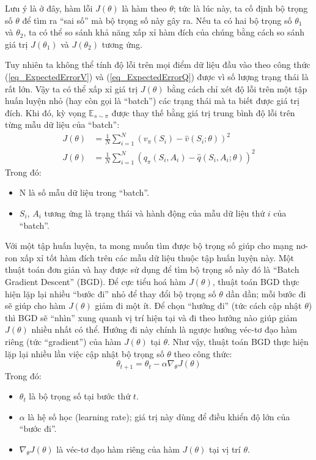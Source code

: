 	Lưu ý là ở đây, hàm lỗi $J(\theta)$ là hàm theo $\theta$; tức là lúc này, ta cố định bộ trọng số $\theta$ để tìm ra ``sai số'' mà bộ trọng số này gây ra.
	Nếu ta có hai bộ trọng số $\theta_1$ và $\theta_2$, ta có thể so sánh khả năng xấp xỉ hàm đích của chúng bằng cách so sánh giá trị $J(\theta_1)$ và $J(\theta_2)$ tương ứng.
	
	Tuy nhiên ta không thể tính độ lỗi trên mọi điểm dữ liệu đầu vào theo công thức (\ref{eq_ExpectedErrorV}) và (\ref{eq_ExpectedErrorQ}) được vì số lượng trạng thái là rất lớn.
	Vậy ta có thể xấp xỉ giá trị $J(\theta)$ bằng cách chỉ xét độ lỗi trên một tập huấn luyện nhỏ (hay còn gọi là ``batch'') các trạng thái mà ta biết được giá trị đích.
	Khi đó, kỳ vọng $\mathbb{E}_{s \sim \pi}$ được thay thế bằng giá trị trung bình độ lỗi trên từng mẫu dữ liệu của ``batch'':
	\begin{align}
		\label{eq_BatchErrorV}
		J(\theta) &= \frac{1}{N} \sum_{i = 1}^{N}(v_{\pi}(S_{i}) - \hat{v}(S_{i};\theta))^2\\
		\label{eq_BatchErrorQ}
		J(\theta) &= \frac{1}{N} \sum_{i = 1}^{N}(q_{\pi}(S_i,A_i) - \hat{q}(S_i,A_i;\theta))^2		
	\end{align}
	Trong đó:
	\begin{itemize}
		\item N là số mẫu dữ liệu trong ``batch''.
		\item $S_i$, $A_i$ tương ứng là trạng thái và hành động của mẫu dữ liệu thứ $i$ của ``batch''.
	\end{itemize}
	Với một tập huấn luyện, ta mong muốn tìm được bộ trọng số giúp cho mạng nơ-ron xấp xỉ tốt hàm đích trên các mẫu dữ liệu thuộc tập huấn luyện này.
	Một thuật toán đơn giản và hay được sử dụng để tìm bộ trọng số này đó là ``Batch Gradient Descent'' (BGD).
	Để cực tiểu hoá hàm $J(\theta)$, thuật toán BGD thực hiện lặp lại nhiều ``bước đi'' nhỏ để thay đổi bộ trọng số $\theta$ dần dần; mỗi bước đi sẽ giúp cho hàm $J(\theta)$ giảm đi một ít.
	Để chọn ``hướng đi'' (tức cách cập nhật $\theta$) thì BGD sẽ ``nhìn'' xung quanh vị trí hiện tại và đi theo hướng nào giúp giảm $J(\theta)$ nhiều nhất có thể.
	Hướng đi này chính là ngược hướng véc-tơ đạo hàm riêng (tức ``gradient'') của hàm $J(\theta)$ tại $\theta$.
	Như vậy, thuật toán BGD thực hiện lặp lại nhiều lần việc cập nhật bộ trọng số $\theta$ theo công thức:
	\begin{equation}
		\theta_{t+1} = \theta_{t} - \alpha \nabla_{\theta}J(\theta)
	\end{equation}
	Trong đó:
	\begin{itemize}
		\item $\theta_{t}$ là bộ trọng số tại bước thứ $t$.
		\item $\alpha$ là hệ số học (learning rate); giá trị này dùng để điều khiển độ lớn của ``bước đi''.
		\item $\nabla_{\theta}J(\theta)$ là véc-tơ đạo hàm riêng của hàm $J(\theta)$ tại vị trí $\theta$.
	\end{itemize}
